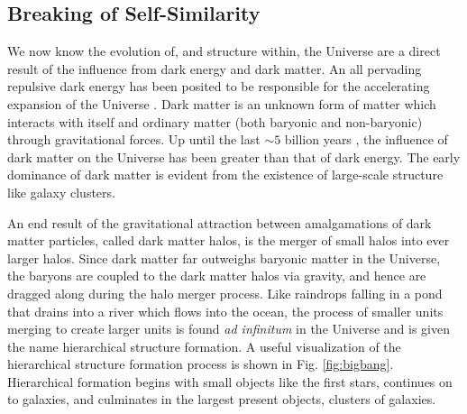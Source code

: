 \subsection{Breaking of Self-Similarity}
\label{sec:ssbreak}

We now know the evolution of, and structure within, the Universe are a
direct result of the influence from dark energy and dark matter. An
all pervading repulsive dark energy has been posited to be responsible
for the accelerating expansion of the Universe
\citep{1998AJ....116.1009R, 1999ApJ...517..565P,
2007ApJ...659...98R}. Dark matter is an unknown form of matter which
interacts with itself and ordinary matter (both baryonic and
non-baryonic) through gravitational forces. Up until the last $\sim 5$
billion years \citep{1998AJ....116.1009R, 1999ApJ...517..565P,
2007ApJ...659...98R}, the influence of dark matter on the Universe has
been greater than that of dark energy. The early dominance of dark
matter is evident from the existence of large-scale structure like
galaxy clusters.

An end result of the gravitational attraction between amalgamations of
dark matter particles, called dark matter halos, is the merger of
small halos into ever larger halos. Since dark matter far outweighs
baryonic matter in the Universe, the baryons are coupled to the dark
matter halos via gravity, and hence are dragged along during the halo
merger process. Like raindrops falling in a pond that drains into a
river which flows into the ocean, the process of smaller units merging
to create larger units is found {\it{ad infinitum}} in the Universe
and is given the name hierarchical structure formation. A useful
visualization of the hierarchical structure formation process is shown
in Fig. \ref{fig:bigbang}. Hierarchical formation begins with small
objects like the first stars, continues on to galaxies, and culminates
in the largest present objects, clusters of galaxies.

